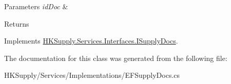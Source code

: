 \begin{DoxyParams}{Parameters}
{\em id\+Doc} & \\
\hline
\end{DoxyParams}
\begin{DoxyReturn}{Returns}

\end{DoxyReturn}


Implements \mbox{\hyperlink{interface_h_k_supply_1_1_services_1_1_interfaces_1_1_i_supply_docs}{H\+K\+Supply.\+Services.\+Interfaces.\+I\+Supply\+Docs}}.



The documentation for this class was generated from the following file\+:\begin{DoxyCompactItemize}
\item 
H\+K\+Supply/\+Services/\+Implementations/E\+F\+Supply\+Docs.\+cs\end{DoxyCompactItemize}
